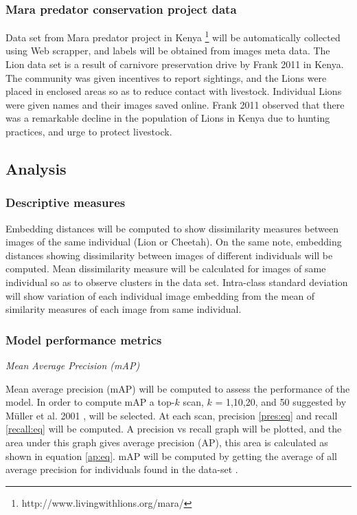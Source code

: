 \subsubsection{Mara predator conservation project data}
Data set from Mara predator project in Kenya \footnote{http://www.livingwithlions.org/mara/}  will be automatically collected using Web scrapper, and labels will be obtained from images meta data. The Lion data set is a result of carnivore preservation drive by Frank 2011 \cite{frank2011living} in Kenya. The community was given incentives to report sightings, and the Lions were placed in enclosed areas so as to reduce contact with livestock. Individual Lions were given names and their images saved online. Frank 2011 observed that there was a remarkable decline in the population of Lions in Kenya due to hunting practices, and urge to protect livestock.  
\subsection{Analysis}
\subsubsection{Descriptive measures }
Embedding distances will be computed to show dissimilarity measures between images of the same individual (Lion or Cheetah). On the same note, embedding distances showing dissimilarity between images of different individuals will be computed. Mean dissimilarity measure will be calculated for images of same individual so as to observe clusters in the data set. Intra-class standard deviation will show variation of each individual image embedding from the mean of similarity measures of each image from same individual.  

\subsubsection{Model performance  metrics}
\textit{Mean Average Precision (mAP)}\newline

Mean average precision (mAP) will be computed to assess the performance of the model. In order to compute mAP a top-$k$ scan, $k$ = 1,10,20, and 50 suggested by M{\"u}ller et al. 2001 \cite{muller2001performance}, will be selected. At each scan, precision \ref{pres:eq} and recall \ref{recall:eq} will be computed. A precision vs recall graph will be plotted, and the area under this graph gives average precision (AP), this area is calculated as shown in equation \ref{ap:eq}.  mAP  will be computed by getting the average of all average precision for individuals found in the data-set \cite{everingham2015pascal}.

